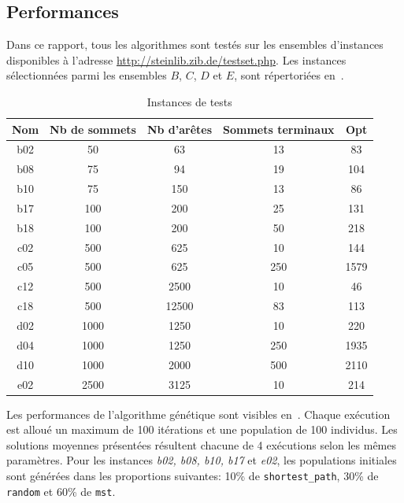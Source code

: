 \documentclass[10pt]{article}
\begin{document}
	\subsection{Performances}
	\label{sec-perf}
	
	Dans ce rapport, tous les algorithmes sont testés sur les ensembles d'instances disponibles à l'adresse \url{http://steinlib.zib.de/testset.php}. Les instances sélectionnées parmi les ensembles $B$, $C$, $D$ et $E$, sont répertoriées en~.
	
	\begin{table}[h!]
		\centering
		\begin{tabular}{|c|c|c|c|c|}
			\hline
			\textbf{Nom} & \textbf{Nb de sommets} & \textbf{Nb d'arêtes} & \textbf{Sommets terminaux} & \textbf{Opt} \\
			\hline
			b02 & 50 & 63 & 13 & 83 \\
			b08	& 75 & 94 &	19 & 104 \\
			b10	& 75 & 150 & 13 & 86 \\
			b17	& 100 &	200 & 25 & 131 \\
			b18	& 100 & 200 & 50 & 218 \\
			c02	& 500 & 625 & 10 & 144 \\
			c05	& 500 & 625 & 250 & 1579 \\
			c12	& 500 & 2500 & 10 & 46 \\
			c18 & 500 & 12500 & 83 & 113 \\
			d02	& 1000 & 1250 & 10 & 220 \\
			d04	& 1000 & 1250 & 250 & 1935 \\
			d10	& 1000 & 2000 &	500 & 2110 \\
			e02	& 2500 & 3125 & 10 & 214 \\
			\hline
		\end{tabular}
		\caption{Instances de tests}
		\label{tab-instances}
	\end{table}
	
	Les performances de l'algorithme génétique sont visibles en~. Chaque exécution est alloué un maximum de 100 itérations et une population de 100 individus. Les solutions moyennes présentées résultent chacune de 4 exécutions selon les mêmes paramètres.
	Pour les instances \textit{b02, b08, b10, b17} et \textit{e02}, les populations initiales sont générées dans les proportions suivantes: 10\% de \texttt{shortest\_path}, 30\% de \texttt{random} et 60\% de \texttt{mst}.
\end{document}
